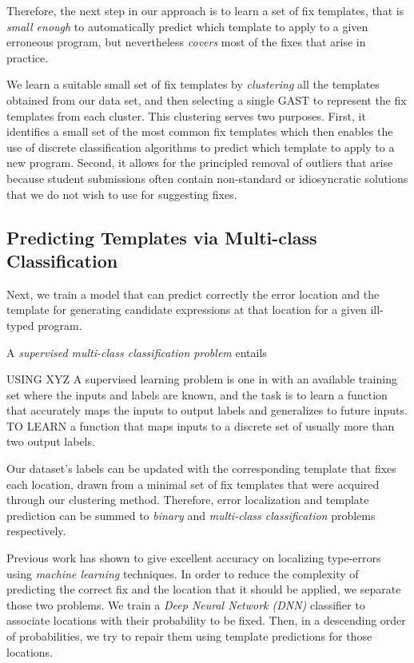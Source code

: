Therefore, the next step in our approach is to learn 
a set of fix templates, that is \emph{small enough} to 
automatically predict which template to apply to a given 
erroneous program, but nevertheless \emph{covers}
most of the fixes that arise in practice.

 We learn a suitable small 
set of fix templates by \emph{clustering} all the templates 
obtained from our data set, and then selecting a single GAST 
to represent the fix templates from each cluster.
%
This clustering serves two purposes. 
%
First, it identifies a small set of the most common fix templates 
which then enables the use of discrete classification algorithms
to predict which template to apply to a new program.
%
Second, it allows for the principled removal of outliers that 
arise because student submissions often contain non-standard 
or idiosyncratic solutions that we do not wish to use for suggesting 
fixes.

\subsection{Predicting Templates via Multi-class Classification} 
\label{sec:overview:predict}

Next, we train a model that can predict correctly the error location and
the template for generating candidate expressions at that location for a 
given ill-typed program. 

%
A \emph{supervised multi-class classification problem} entails 

USING XYZ
  A supervised learning problem is one in with an available training 
  set where the inputs and labels are known, and the
  task is to learn a function that accurately maps the inputs to output labels and
  generalizes to future inputs.
TO LEARN a function that maps inputs to a discrete set of usually more than two output 
labels. 

%
Our
dataset's labels can be updated with the corresponding template that fixes each
location, drawn from a minimal set of fix templates that were acquired through
our clustering method. Therefore, error localization and template prediction can
be summed to \emph{binary} and \emph{multi-class classification} problems
respectively.

 Previous work has shown to give excellent accuracy
on localizing type-errors using \emph{machine learning} techniques. In order to
reduce the complexity of predicting the correct fix and the location that it
should be applied, we separate those two problems. We train a \emph{Deep Neural
Network (DNN)} classifier to associate locations with their probability to be
fixed. Then, in a descending order of probabilities, we try to repair them using
template predictions for those locations.

